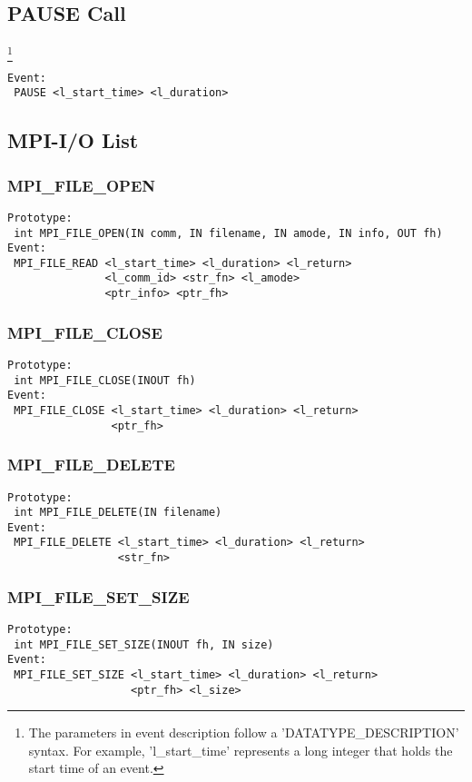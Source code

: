 \documentclass[9pt]{article}
\begin{document}
\subsection{PAUSE Call}\footnote{The parameters in event description follow a 'DATATYPE\_DESCRIPTION' syntax. For example, 'l\_start\_time' represents a long integer that holds the start time of an event.}
\label{sec:PAUSECall}
\begin{verbatim}
Event:
 PAUSE <l_start_time> <l_duration>
\end{verbatim}

\subsection{MPI-I/O List}
\label{sec:MPIIOList}

\subsubsection{MPI\_FILE\_OPEN}
\label{sec:MPIFILEOPEN}
\begin{verbatim}
Prototype: 
 int MPI_FILE_OPEN(IN comm, IN filename, IN amode, IN info, OUT fh)
Event: 
 MPI_FILE_READ <l_start_time> <l_duration> <l_return> 
               <l_comm_id> <str_fn> <l_amode> 
               <ptr_info> <ptr_fh>
\end{verbatim}

\subsubsection{MPI\_FILE\_CLOSE}
\label{sec:MPIFILECLOSE}
\begin{verbatim}
Prototype: 
 int MPI_FILE_CLOSE(INOUT fh)
Event: 
 MPI_FILE_CLOSE <l_start_time> <l_duration> <l_return> 
                <ptr_fh>
\end{verbatim}

\subsubsection{MPI\_FILE\_DELETE}
\label{sec:MPIFILEDELETE}
\begin{verbatim}
Prototype: 
 int MPI_FILE_DELETE(IN filename)
Event: 
 MPI_FILE_DELETE <l_start_time> <l_duration> <l_return>
                 <str_fn>
\end{verbatim}

\subsubsection{MPI\_FILE\_SET\_SIZE}
\label{sec:MPIFILESETSIZE}
\begin{verbatim}
Prototype: 
 int MPI_FILE_SET_SIZE(INOUT fh, IN size)
Event: 
 MPI_FILE_SET_SIZE <l_start_time> <l_duration> <l_return>
                   <ptr_fh> <l_size>
\end{verbatim}
\end{document}
